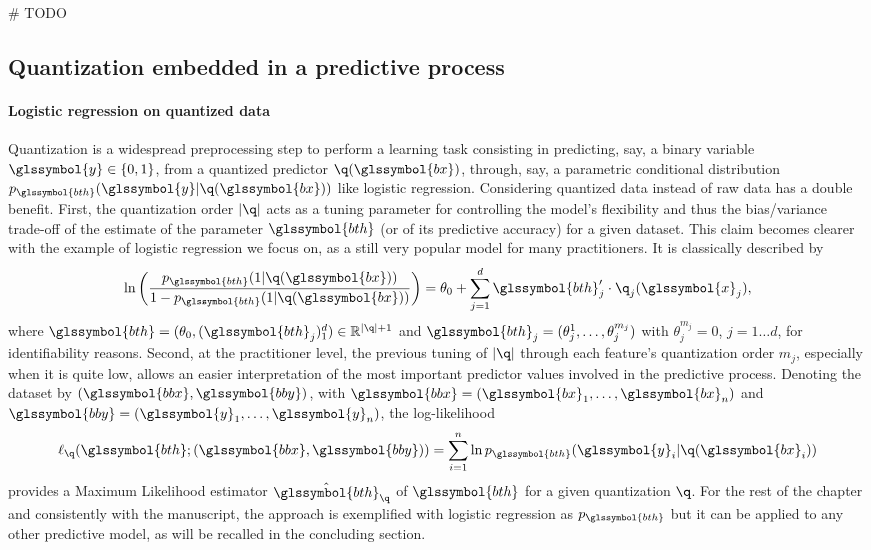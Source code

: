 \# TODO


\subsection{Quantization embedded in a predictive process}

\paragraph{Logistic regression on quantized data}

Quantization is a widespread preprocessing step to perform a learning task consisting in predicting, say, a binary variable $\glssymbol{y}\in\{0,1\}$, from a quantized predictor  $\q(\glssymbol{bx})$, through, say, a parametric conditional distribution $p_{\glssymbol{bth}}(\glssymbol{y}|\q(\glssymbol{bx}))$ like logistic regression. Considering quantized data instead of raw data has a double benefit. First, the quantization order $|\q|$ acts as a tuning parameter for controlling the model's flexibility and thus the bias/variance trade-off of the estimate of the parameter $\glssymbol{bth}$ (or of its predictive accuracy) for a given dataset. This claim becomes clearer with the example of logistic regression we focus on, as a still very popular model for many practitioners. It is classically described by
\begin{equation}
    \label{eq:reglogq}
\ln \left( \dfrac{p_{\glssymbol{bth}}(1|\q(\glssymbol{bx}))}{1 - p_{\glssymbol{bth}}(1|\q(\glssymbol{bx}))} \right) = \theta_0 + \sum_{j=1}^d \glssymbol{bth}_j' \cdot \q_j(\glssymbol{x}_j),
\end{equation}
where $\glssymbol{bth} = (\theta_{0},(\glssymbol{bth}_j)_1^d) \in \mathbb{R}^{|\q|+1}$ and $\glssymbol{bth}_j = (\theta_{j}^{1},\dots,\theta_{j}^{m_j})$ with $\theta_{j}^{m_j} = 0$, $j=1 \ldots d$, for identifiability reasons.
Second, at the practitioner level, the previous tuning of $|\q|$ through each feature's quantization order $m_j$, especially when it is quite low, allows an easier interpretation of the most important predictor values involved in the predictive process. Denoting the dataset by $(\glssymbol{bbx},\glssymbol{bby})$, with $\glssymbol{bbx}=(\glssymbol{bx}_1,\ldots,\glssymbol{bx}_n)$ and $\glssymbol{bby}=(\glssymbol{y}_1,\ldots,\glssymbol{y}_n)$, the log-likelihood 
\begin{equation}
\label{eq:lq}
\ell_{\q}(\glssymbol{bth} ; (\glssymbol{bbx},\glssymbol{bby}))=\sum_{i=1}^n \ln p_{\glssymbol{bth}}(\glssymbol{y}_i|\q(\glssymbol{bx}_i))
\end{equation}
provides a Maximum Likelihood estimator $\hat{\glssymbol{bth}}_\q$ of $\glssymbol{bth}$ for a given quantization $\q$. For the rest of the chapter and consistently with the manuscript, the approach is exemplified with logistic regression as $p_{\glssymbol{bth}}$ but it can be applied to any other predictive model, as will be recalled in the concluding section.



